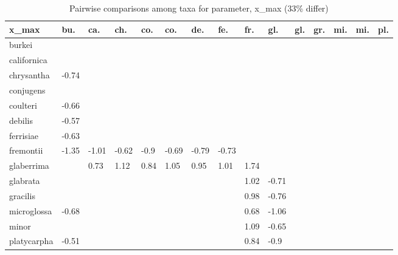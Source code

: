 \begin{table}[ht]
\centering
\caption{Pairwise comparisons among taxa for parameter, x\_max (33\% differ)} 
\begin{tabular}{lllllllllllllll}
  \hline
x\_max & bu. & ca. & ch. & co. & co. & de. & fe. & fr. & gl. & gl. & gr. & mi. & mi. & pl. \\ 
  \hline
burkei &  &  &  &  &  &  &  &  &  &  &  &  &  &  \\ 
  californica &  &  &  &  &  &  &  &  &  &  &  &  &  &  \\ 
  chrysantha & -0.74 &  &  &  &  &  &  &  &  &  &  &  &  &  \\ 
  conjugens &  &  &  &  &  &  &  &  &  &  &  &  &  &  \\ 
  coulteri & -0.66 &  &  &  &  &  &  &  &  &  &  &  &  &  \\ 
  debilis & -0.57 &  &  &  &  &  &  &  &  &  &  &  &  &  \\ 
  ferrisiae & -0.63 &  &  &  &  &  &  &  &  &  &  &  &  &  \\ 
  fremontii & -1.35 & -1.01 & -0.62 & -0.9 & -0.69 & -0.79 & -0.73 &  &  &  &  &  &  &  \\ 
  glaberrima &  & 0.73 & 1.12 & 0.84 & 1.05 & 0.95 & 1.01 & 1.74 &  &  &  &  &  &  \\ 
  glabrata &  &  &  &  &  &  &  & 1.02 & -0.71 &  &  &  &  &  \\ 
  gracilis &  &  &  &  &  &  &  & 0.98 & -0.76 &  &  &  &  &  \\ 
  microglossa & -0.68 &  &  &  &  &  &  & 0.68 & -1.06 &  &  &  &  &  \\ 
  minor &  &  &  &  &  &  &  & 1.09 & -0.65 &  &  &  &  &  \\ 
  platycarpha & -0.51 &  &  &  &  &  &  & 0.84 & -0.9 &  &  &  &  &  \\ 
   \hline
\end{tabular}
\end{table}
